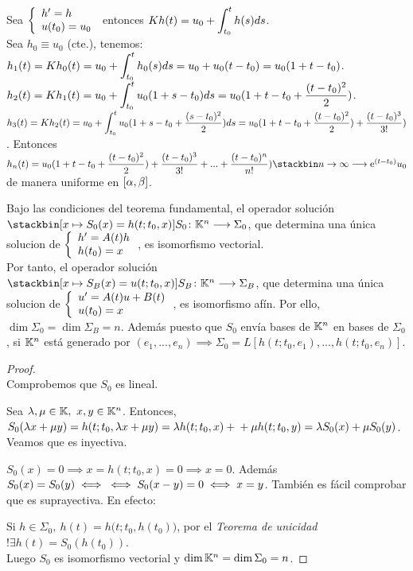 \begin{ejem} Sea $\doubleleft{h'=h}{u(t_0)=u_0}$ entonces $Kh(t)=u_0+\integral{t}{t_0}h(s)ds$.\\
Sea $h_0\equiv u_0$ (cte.), tenemos:\\
$h_1(t)=Kh_0(t)=u_0+\integral{t}{t_0}h_0(s)ds=u_0+u_0(t-t_0)=u_0(1+t-t_0)$.
$h_2(t)=Kh_1(t)=u_0+\integral{t}{t_0}u_0(1+s-t_0)ds= u_0(1+t-t_0+\dfrac{(t-t_0)^2}{2})$. $h_3(t)=Kh_2(t)= u_0 +\integral{t}{t_0}u_0(1+s-t_0+ \dfrac{(s-t_0)^2}{2})ds=u_0(1+t-t_0+ \dfrac{(t-t_0)^2}{2}) + \dfrac{(t-t_0)^3}{3!})$. Entonces $h_n(t)=u_0(1+t-t_0+ \dfrac{(t-t_0)^2}{2}) + \dfrac{(t-t_0)^3}{3!} + ... + \dfrac{(t-t_0)^n}{n!})\limited{\e^{(t-t_0)}u_0}$ de manera uniforme en $\alphabeta$.
\end{ejem}

\begin{corolario}
Bajo las condiciones del teorema fundamental, el operador solución $\xfunction{S_0}{\K^n}{\Sigma_0}{x\mapsto S_0(x)= h(t;t_0, x)}$, que determina una única solucion de $\doubleleft{h'=A(t)h}{h(t_0)=x}$, es isomorfismo vectorial.\\
Por tanto, el operador solución $\xfunction{S_B}{\K^n}{\Sigma_B}{x\mapsto S_B(x)=u(t;t_0, x)}$, que determina una única solucion de $\doubleleft{u'=A(t)u + B(t)}{u(t_0)=x}$, es isomorfismo afín.
Por ello, $\dim\Sigma_0=\dim\Sigma_B=n$. Además puesto que $S_0$ envía bases de $\K^n$ en bases de $\Sigma_0$, si $\K^n$ está generado por $(e_1,...,e_n) \implies \Sigma_0=L[h(t;t_0,e_1),...,h(t;t_0,e_n)]$.
\begin{proof}\ \\
Comprobemos que $S_0$ es lineal.

Sea $\lambda , \mu \in \K, \ x,y \in \K^n$. Entonces, $ S_0(\lambda x +\mu y)= h(t;t_0,\lambda x +\mu y)= \lambda h(t;t_0,x)+\\+ \mu h(t;t_0,y)= \lambda S_0(x) + \mu S_0(y)$.
Veamos que es inyectiva.

$S_0(x)=0 \implies x=h(t;t_0,x)=0 \implies x=0$. Además $S_0(x)=S_0(y) \iff\\\iff S_0(x-y)=0 \iff x=y$. También es fácil comprobar que es suprayectiva. En efecto:

Si $h \in \Sigma_0,\ h(t)=h\big(t;t_0,h(t_0)\big)$, por el \textit{Teorema de unicidad} $!\exists h(t)=S_0(h(t_0))$.\\
Luego $S_0$ es isomorfismo vectorial y $\dim\K^n = \dim \Sigma_0 = n$.
\end{proof} 
\end{corolario}

